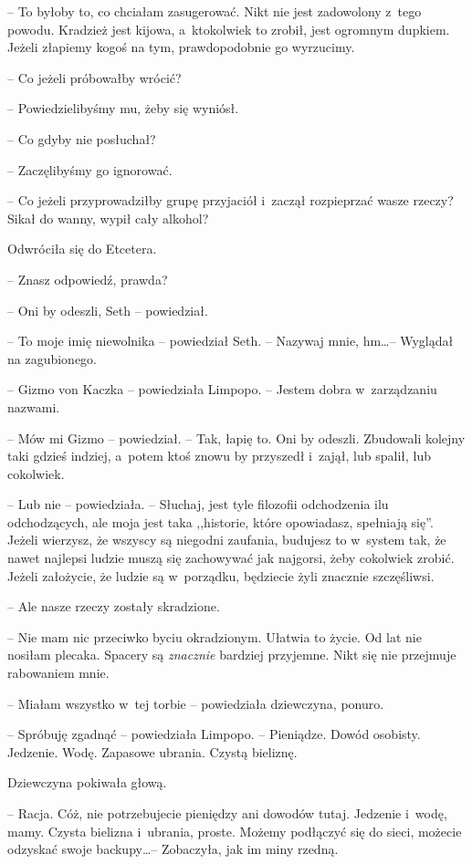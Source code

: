 \documentclass[oneside,polish,11pt,sfheadings]{mwbk}
\begin{document}
-- To byłoby to, co chciałam zasugerować. Nikt nie jest
zadowolony z~tego powodu. Kradzież jest kijowa, a~ktokolwiek to zrobił,
jest ogromnym dupkiem. Jeżeli złapiemy kogoś na tym, prawdopodobnie go
wyrzucimy.

-- Co jeżeli próbowałby wrócić?

-- Powiedzielibyśmy mu, żeby się wyniósł.

-- Co gdyby nie posłuchał?

-- Zaczęlibyśmy go ignorować.

-- Co jeżeli przyprowadziłby grupę przyjaciół i~zaczął rozpieprzać wasze
rzeczy? Sikał do wanny, wypił cały alkohol?

Odwróciła się do Etcetera. 

-- Znasz odpowiedź, prawda?

-- Oni by odeszli, Seth -- powiedział.

-- To moje imię niewolnika -- powiedział Seth. -- Nazywaj mnie, hm\ldots  -- Wyglądał na zagubionego.

-- Gizmo von Kaczka -- powiedziała Limpopo. -- Jestem dobra w~zarządzaniu
nazwami.

-- Mów mi Gizmo -- powiedział. -- Tak, łapię to. Oni by odeszli. Zbudowali
kolejny taki gdzieś indziej, a~potem ktoś znowu by przyszedł i~zajął,
lub spalił, lub cokolwiek.

-- Lub nie -- powiedziała. -- Słuchaj, jest tyle filozofii odchodzenia ilu
odchodzących, ale moja jest taka ,,historie, które opowiadasz, spełniają
się''. Jeżeli wierzysz, że wszyscy są niegodni zaufania, budujesz to w~system tak, że nawet najlepsi ludzie muszą się zachowywać jak najgorsi,
żeby cokolwiek zrobić. Jeżeli założycie, że ludzie są w~porządku,
będziecie żyli znacznie szczęśliwsi.

-- Ale nasze rzeczy zostały skradzione.

-- Nie mam nic przeciwko byciu okradzionym. Ułatwia to życie. Od lat nie
nosiłam plecaka. Spacery są \textit{znacznie} bardziej przyjemne. Nikt się
nie przejmuje rabowaniem mnie.

-- Miałam wszystko w~tej torbie -- powiedziała dziewczyna, ponuro.

-- Spróbuję zgadnąć -- powiedziała Limpopo. -- Pieniądze. Dowód osobisty.
Jedzenie. Wodę. Zapasowe ubrania. Czystą bieliznę.

Dziewczyna pokiwała głową.

-- Racja. Cóż, nie potrzebujecie pieniędzy ani dowodów tutaj. Jedzenie i~wodę, mamy. Czysta bielizna i~ubrania, proste. Możemy podłączyć się do
sieci, możecie odzyskać swoje backupy\ldots  -- Zobaczyła, jak im miny
rzedną.
\end{document}
